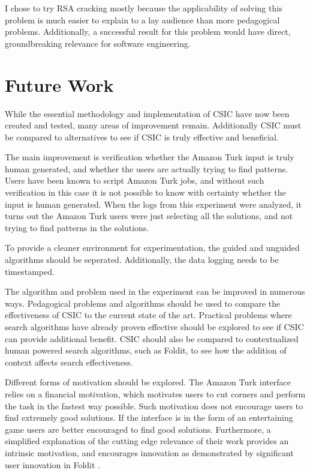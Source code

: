I chose to try RSA cracking mostly because the applicability of solving this problem is much easier to explain to a lay audience than more pedagogical problems.  Additionally, a successful result for this problem would have direct, groundbreaking relevance for software engineering.

\section{Future Work}\label{sec:future-work}

While the essential methodology and implementation of CSIC have now been created and tested, many areas of improvement remain.  Additionally CSIC must be compared to alternatives to see if CSIC is truly effective and beneficial.

The main improvement is verification whether the Amazon Turk input is truly human generated, and whether the users are actually trying to find patterns.  Users have been known to script Amazon Turk jobs, and without such verification in this case it is not possible to know with certainty whether the input is human generated.  When the logs from this experiment were analyzed, it turns out the Amazon Turk users were just selecting all the solutions, and not trying to find patterns in the solutions.

To provide a cleaner environment for experimentation, the guided and unguided algorithms should be seperated.  Additionally, the data logging needs to be timestamped.

The algorithm and problem used in the experiment can be improved in numerous ways.  Pedagogical problems and algorithms should be used to compare the effectiveness of CSIC to the current state of the art.  Practical problems where search algorithms have already proven effective should be explored to see if CSIC can provide additional benefit.  CSIC should also be compared to contextualized human powered search algorithms, such as Foldit, to see how the addition of context affects search effectiveness.  

Different forms of motivation should be explored.  The Amazon Turk interface relies on a financial motivation, which motivates users to cut corners and perform the task in the fastest way possible.  Such motivation does not encourage users to find extremely good solutions.  If the interface is in the form of an entertaining game users are better encouraged to find good solutions.  Furthermore, a simplified explanation of the cutting edge relevance of their work provides an intrinsic motivation, and encourages innovation as demonstrated by significant user innovation in Foldit \cite{moore12:_foldit_game_leads_to_aids_resear_break}.



